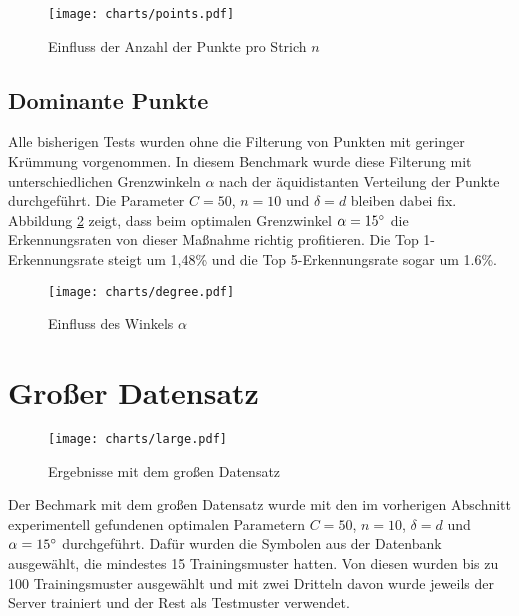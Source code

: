 \begin{figure}[htbp]
  \begin{center}
    \texttt{[image: charts/points.pdf]}
  \end{center}
  \caption{Einfluss der Anzahl der Punkte pro Strich $n$}
  \label{chart:points}
\end{figure}


\subsection{Dominante Punkte} %
\label{sub:dominante_punkte}

Alle bisherigen Tests wurden ohne die Filterung von Punkten mit geringer Krümmung vorgenommen. In diesem Benchmark wurde diese Filterung mit unterschiedlichen Grenzwinkeln $\alpha$ nach der äquidistanten Verteilung der Punkte durchgeführt. Die Parameter $C=50$, $n=10$ und $\delta=d$ bleiben dabei fix. Abbildung \ref{chart:degree} zeigt, dass beim optimalen Grenzwinkel $\alpha=15\degree$ die Erkennungsraten von dieser Maßnahme richtig profitieren. Die Top 1-Erkennungsrate steigt um 1,48\% und die Top 5-Erkennungsrate sogar um 1.6\%.

\begin{figure}[htbp]
  \begin{center}
    \texttt{[image: charts/degree.pdf]}
  \end{center}
  \caption{Einfluss des Winkels $\alpha$}
  \label{chart:degree}
\end{figure}


\section{Großer Datensatz}
\label{sec:grosser_datensatz}

\begin{figure}[htbp]
  \begin{center}
    \texttt{[image: charts/large.pdf]}
  \end{center}
  \caption{Ergebnisse mit dem großen Datensatz}
  \label{chart:large}
\end{figure}

Der Bechmark mit dem großen Datensatz wurde mit den im vorherigen Abschnitt experimentell gefundenen optimalen Parametern $C=50$, $n=10$, $\delta=d$ und $\alpha=15\degree$ durchgeführt. Dafür wurden die Symbolen aus der Datenbank ausgewählt, die mindestes 15 Trainingsmuster hatten. Von diesen wurden bis zu 100 Trainingsmuster ausgewählt und mit zwei Dritteln davon wurde jeweils der Server trainiert und der Rest als Testmuster verwendet.

